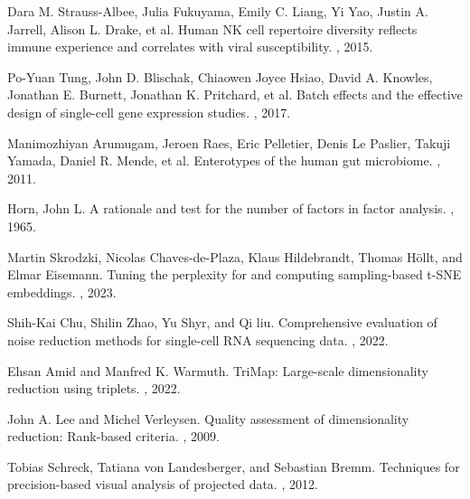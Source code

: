 \documentclass{article}
\begin{document}
\begin{thebibliography}{10}
Dara M. Strauss-Albee, Julia Fukuyama, Emily C. Liang, Yi Yao, Justin A. Jarrell, Alison L. Drake, et al.
\newblock Human NK cell repertoire diversity reflects immune experience and correlates with viral susceptibility.
, 2015.

 Po-Yuan Tung, John D. Blischak, Chiaowen Joyce Hsiao, David A. Knowles, Jonathan E. Burnett, Jonathan K. Pritchard, et al.
 \newblock Batch effects and the effective design of single-cell gene expression studies.
 , 2017.

Manimozhiyan Arumugam, Jeroen Raes, Eric Pelletier, Denis Le Paslier, Takuji Yamada, Daniel R. Mende, et al.
\newblock Enterotypes of the human gut microbiome.
, 2011.

Horn, John L.
\newblock A rationale and test for the number of factors in factor analysis.
, 1965.

Martin Skrodzki, Nicolas Chaves-de-Plaza, Klaus Hildebrandt, Thomas H\"ollt, and Elmar Eisemann.
\newblock Tuning the perplexity for and computing sampling-based t-SNE embeddings.
, 2023.

Shih-Kai Chu, Shilin Zhao, Yu Shyr, and Qi liu.
\newblock Comprehensive evaluation of noise reduction methods for single-cell RNA sequencing data.
, 2022.

Ehsan Amid and Manfred K. Warmuth. 
\newblock TriMap: Large-scale dimensionality reduction using triplets. 
, 2022.

John A. Lee and Michel Verleysen.
\newblock Quality assessment of dimensionality reduction: Rank-based criteria.
, 2009.

Tobias Schreck, Tatiana von Landesberger, and Sebastian Bremm.
\newblock Techniques for precision-based visual analysis of projected data.
, 2012.

\end{thebibliography}
\end{document}
